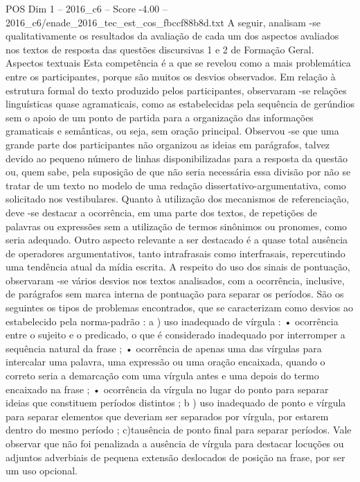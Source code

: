 \begin{textsample}{POS Dim 1 – 2016\_c6 – Score -4.00 – 2016\_c6/enade\_2016\_tec\_est\_cos\_fbccf88b8d.txt}
A seguir, analisam -se qualitativamente os resultados da avaliação de cada um dos aspectos avaliados nos textos de resposta das questões discursivas 1 e 2 de Formação Geral.
Aspectos textuais Esta competência é a que se revelou como a mais problemática entre os participantes, porque são muitos os desvios observados.
Em relação à estrutura formal do texto produzido pelos participantes, observaram -se relações linguísticas quase agramaticais, como as estabelecidas pela sequência de gerúndios sem o apoio de um ponto de partida para a organização das informações gramaticais e semânticas, ou seja, sem oração principal.
Observou -se que uma grande parte dos participantes não organizou as ideias em parágrafos, talvez devido ao pequeno número de linhas disponibilizadas para a resposta da questão ou, quem sabe, pela suposição de que não seria necessária essa divisão por não se tratar de um texto no modelo de uma redação dissertativo-argumentativa, como solicitado nos vestibulares.
Quanto à utilização dos mecanismos de referenciação, deve -se destacar a ocorrência, em uma parte dos textos, de repetições de palavras ou expressões sem a utilização de termos sinônimos ou pronomes, como seria adequado.
Outro aspecto relevante a ser destacado é a quase total ausência de operadores argumentativos, tanto intrafrasais como interfrasais, repercutindo uma tendência atual da mídia escrita.
A respeito do uso dos sinais de pontuação, observaram -se vários desvios nos textos analisados, com a ocorrência, inclusive, de parágrafos sem marca interna de pontuação para separar os períodos.
São os seguintes os tipos de problemas encontrados, que se caracterizam como desvios ao estabelecido pela norma-padrão : a ) uso inadequado de vírgula : • ocorrência entre o sujeito e o predicado, o que é considerado inadequado por interromper a sequência natural da frase ; • ocorrência de apenas uma das vírgulas para intercalar uma palavra, uma expressão ou uma oração encaixada, quando o correto seria a demarcação com uma vírgula antes e uma depois do termo encaixado na frase ; • ocorrência da vírgula no lugar do ponto para separar ideias que constituem períodos distintos ; b ) uso inadequado de ponto e vírgula para separar elementos que deveriam ser separados por vírgula, por estarem dentro do mesmo período ; c)tausência de ponto final para separar períodos.
Vale observar que não foi penalizada a ausência de vírgula para destacar locuções ou adjuntos adverbiais de pequena extensão deslocados de posição na frase, por ser um uso opcional.

\end{textsample}

